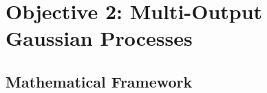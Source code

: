 \section*{Objective 2: Multi-Output Gaussian Processes}

\subsection{Mathematical Framework}

%	
%			
%			
%			
%			
%			
%				
%				
%			
%		
%				
%		


